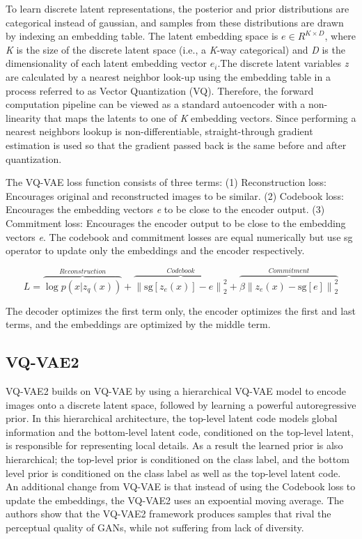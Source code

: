 \documentclass{article}
\begin{document}
To learn discrete latent representations, the posterior and prior distributions are categorical instead of gaussian, and samples from these distributions are drawn by indexing an embedding table. The latent embedding space is \(e \in R^{K \times D}\), where \textit{K} is the size of the discrete latent space (i.e., a \textit{K}-way categorical) and \textit{D} is the dimensionality of each latent embedding vector \(e_{i}\).The discrete latent variables \textit{z} are calculated by a nearest neighbor look-up using the embedding table in a process referred to as Vector Quantization (VQ). Therefore, the forward computation pipeline can be viewed as a standard autoencoder with a non-linearity that maps the latents to one of \textit{K} embedding vectors. Since performing a nearest neighbors lookup is non-differentiable, straight-through gradient estimation is used so that the gradient passed back is the same before and after quantization. 

The VQ-VAE loss function consists of three terms: (1) Reconstruction loss: Encourages original and reconstructed images to be similar. (2) Codebook loss: Encourages the embedding vectors \textit{e} to be close to the encoder output. (3) Commitment loss: Encourages the encoder output to be close to the embedding vectors \textit{e}. The codebook and commitment losses are equal numerically but use \textrm{sg} operator to update only the embeddings and the encoder respectively. 

\begin{equation}
L = \overbrace{\log{p(x|z_q(x))}}^{Reconstruction} + \overbrace{{\|\textrm{sg}[z_e(x)]-e\|}_{2}^{2}}^{Codebook} + \overbrace{\beta{\|z_e(x)-\textrm{sg}[e]\|}_{2}^{2}}^{Commitment}
\end{equation}

The decoder optimizes the first term only, the encoder optimizes the first and last terms, and the embeddings are optimized by the middle term. 

\subsection{VQ-VAE2}

VQ-VAE2 builds on VQ-VAE by using a hierarchical VQ-VAE model to encode images onto a discrete latent space, followed by learning a powerful autoregressive prior. In this hierarchical architecture, the top-level latent code models global information and the bottom-level latent code, conditioned on the top-level latent, is responsible for representing local details. As a result the learned prior is also hierarchical; the top-level prior is conditioned on the class label, and the bottom level prior is conditioned on the class label as well as the top-level latent code. An additional change from VQ-VAE is that instead of using the Codebook loss to update the embeddings, the VQ-VAE2 uses an expoential moving average. The authors show that the VQ-VAE2 framework produces samples that rival the perceptual quality of GANs, while not suffering from lack of diversity. 
\end{document}
